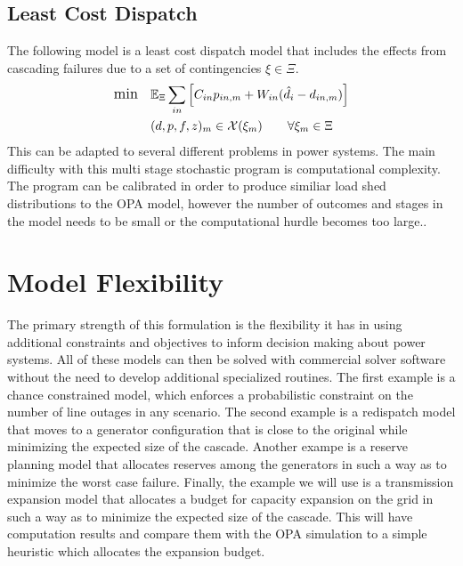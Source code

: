 \subsection{Least Cost Dispatch}
The following model is a least cost dispatch model that includes the effects from cascading failures due to a set of contingencies $\xi\in\Xi$.  
\begin{subequations}
\label{leastcost}
\begin{align} \displaystyle
	{\large \mbox{min}} \hspace{10px} &  \Expect_\Xi \sum_{in} \left[ C_{in}  p_{in,m}  + W_{in} (\hat{d}_{i} - d_{in,m}) \right]	\\
	&(d,p,f,z)_m  \in \cX(\xi_m)    \hspace{20px}   \forall \xi_m \in \Xi	
\end{align}
\end{subequations}
This can be adapted to several different problems in power systems.  The main difficulty with this multi stage stochastic program is computational complexity.  The program can be calibrated in order to produce similiar load shed distributions to the OPA model, however the number of outcomes and stages in the model needs to be small or the computational hurdle becomes too large.\endnote{}.


\section{Model Flexibility}
The primary strength of this formulation is the flexibility it has in using additional constraints and objectives to inform decision making about power systems.  All of these models can then be solved with commercial solver software without the need to develop additional specialized routines.  The first example is a chance constrained model, which enforces a probabilistic constraint on the number of line outages in any scenario. \endnote{}  The second example is a redispatch model that moves to a generator configuration that is close to the original while minimizing the expected size of the cascade.\endnote{}  Another exampe is a reserve planning model that allocates reserves among the generators in such a way as to minimize the worst case failure.\endnote{}  Finally, the example we will use is a transmission expansion model that allocates a budget for capacity expansion on the grid in such a way as to minimize the expected size of the cascade.  This will have computation results and compare them with the OPA simulation to a simple heuristic which allocates the expansion budget.




